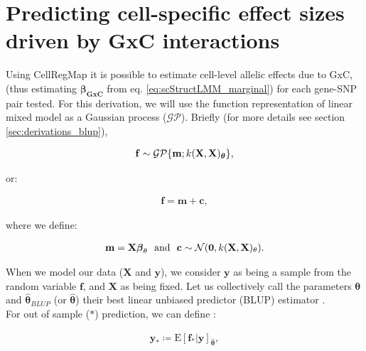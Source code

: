 \section{Predicting cell-specific effect sizes driven by GxC interactions}
\label{sec:beta_gxe}

Using CellRegMap it is possible to estimate cell-level allelic effects due to GxC, (thus estimating $\boldsymbol{\beta_{GxC}}$ from eq. \eqref{eq:scStructLMM_marginal}) for each gene-SNP pair tested.
For this derivation, we will use the function representation of linear mixed model as a Gaussian process ($\mathcal{GP}$).
Briefly (for more details see section \ref{sec:derivations_blup}), 


\begin{align}
    \mathbf{f} \sim \mathcal{GP}\{\mathbf{m}; k(\mathbf{X}, \mathbf{X})_{\boldsymbol{\theta}}\},
\end{align}

or:

\begin{align}
    \mathbf{f} = \mathbf{m} + \mathbf{c},
\end{align}

where we define:

\begin{align}
    \mathbf{m} = \mathbf{X} \boldsymbol{\beta}_{\theta}
     \text{~~and~~}
     \mathbf{c} \sim \mathcal N(\mathbf{0}, k(\mathbf{X}, \mathbf{X})_{\theta}). 
\end{align}

When we model our data ($\mathbf{X}$ and $\mathbf{y}$), we consider $\mathbf{y}$ as being a sample from the random variable $\mathbf{f}$, and $\mathbf{X}$ as being fixed.
Let us collectively call the parameters $\boldsymbol{\theta}$ and  $\hat{\boldsymbol{\theta}}_{BLUP}$ (or $\hat{\boldsymbol{\theta}}$) their best linear unbiased predictor (BLUP) estimator \cite{robinson1991blup}. \\

For out of sample ($*$) prediction, we can define \cite{rasmussen2003gaussian}:

\begin{align}
    \mathbf{y}_* \coloneqq \mathrm{E}[\mathbf{f}_* | \mathbf{y}]_{\hat{\boldsymbol{\theta}}},
\end{align}

